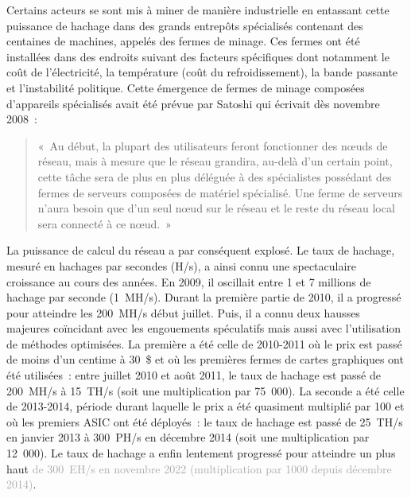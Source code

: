 Certains acteurs se sont mis à miner de manière industrielle en entassant cette puissance de hachage dans des grands entrepôts spécialisés contenant des centaines de machines, appelés des fermes de minage. Ces fermes ont été installées dans des endroits suivant des facteurs spécifiques dont notamment le coût de l'électricité, la température (coût du refroidissement), la bande passante et l'instabilité politique. Cette émergence de fermes de minage composées d'appareils spécialisés avait été prévue par Satoshi qui écrivait dès novembre 2008~:

\begin{quote}
«~Au début, la plupart des utilisateurs feront fonctionner des nœuds de réseau, mais à mesure que le réseau grandira, au-delà d'un certain point, cette tâche sera de plus en plus déléguée à des spécialistes possédant des fermes de serveurs composées de matériel spécialisé. Une ferme de serveurs n'aura besoin que d'un seul nœud sur le réseau et le reste du réseau local sera connecté à ce nœud.~»
\end{quote}


La puissance de calcul du réseau a par conséquent explosé. Le taux de hachage, mesuré en hachages par secondes (H/s), a ainsi connu une spectaculaire croissance au cours des années. En 2009, il oscillait entre 1 et 7 millions de hachage par seconde (1~MH/s). Durant la première partie de 2010, il a progressé pour atteindre les 200~MH/s début juillet. Puis, il a connu deux hausses majeures coïncidant avec les engouements spéculatifs mais aussi avec l'utilisation de méthodes optimisées. La première a été celle de 2010-2011 où le prix est passé de moins d'un centime à 30~\$ et où les premières fermes de cartes graphiques ont été utilisées~: entre juillet 2010 et août 2011, le taux de hachage est passé de 200~MH/s à 15~TH/s (soit une multiplication par 75~000). La seconde a été celle de 2013-2014, période durant laquelle le prix a été quasiment multiplié par 100 et où les premiers ASIC ont été déployés~: le taux de hachage est passé de 25~TH/s en janvier 2013 à 300~PH/s en décembre 2014 (soit une multiplication par 12~000). Le taux de hachage a enfin lentement progressé pour atteindre un plus haut \textcolor{darkgray}{de 300~EH/s en novembre 2022 (multiplication par 1000 depuis décembre 2014)}.

